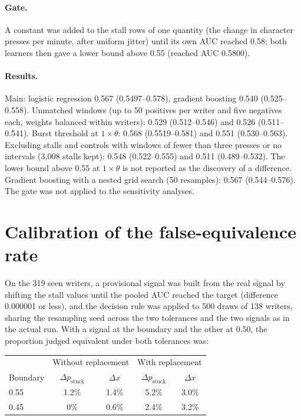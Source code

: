 \paragraph{Gate.} A constant was added to the stall rows of one quantity (the change in character presses per minute,
after uniform jitter) until its own AUC reached 0.58; both learners then gave a lower bound above 0.55 (reached AUC
0.5800).

\paragraph{Results.} Main: logistic regression 0.567 (0.5497--0.578), gradient boosting 0.540 (0.525--0.558). Unmatched
windows (up to 50 positives per writer and five negatives each, weights balanced within writers): 0.529 (0.512--0.546)
and 0.526 (0.511--0.541). Burst threshold at $1 \times \theta$: 0.568 (0.5519--0.581) and 0.551 (0.530--0.563).
Excluding stalls and controls with windows of fewer than three presses or no intervals (3,008 stalls kept): 0.548
(0.522--0.555) and 0.511 (0.489--0.532). The lower bound above 0.55 at $1 \times \theta$ is not reported as the
discovery of a difference. Gradient boosting with a nested grid search (50 resamples): 0.567
(0.544--0.576). The gate was not applied to the sensitivity analyses.

\section{Calibration of the false-equivalence rate}
\label{app:calibration}

On the 319 seen writers, a provisional signal was built from the real signal by shifting the stall values until the
pooled AUC reached the target (difference 0.000001 or less), and the decision rule was applied to 500 draws of 138
writers, sharing the resampling seed across the two tolerances and the two signals as in the actual run. With a signal
at the boundary and the other at 0.50, the proportion judged equivalent under both tolerances was:

\begin{center}\small
\begin{tabular}{l c c c c}
  \toprule
  & \multicolumn{2}{c}{Without replacement} & \multicolumn{2}{c}{With replacement} \\
  Boundary & $\Delta p_{\mathrm{stuck}}$ & $\Delta x$ & $\Delta p_{\mathrm{stuck}}$ & $\Delta x$ \\
  \midrule
  0.55 & 1.2\% & 1.4\% & 5.2\% & 3.0\% \\
  0.45 & 0\% & 0.6\% & 2.4\% & 3.2\% \\
  \bottomrule
\end{tabular}
\end{center}

